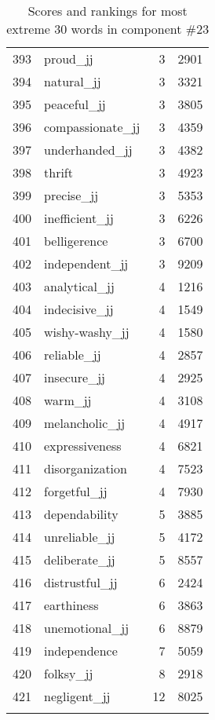 \begin{longtable}[!htbp]{| rlr@{.}l |}
    393 & proud\_jj & 3 & 2901 \\
    394 & natural\_jj & 3 & 3321 \\
    395 & peaceful\_jj & 3 & 3805 \\
    396 & compassionate\_jj & 3 & 4359 \\
    397 & underhanded\_jj & 3 & 4382 \\
    398 & thrift & 3 & 4923 \\
    399 & precise\_jj & 3 & 5353 \\
    400 & inefficient\_jj & 3 & 6226 \\
    401 & belligerence & 3 & 6700 \\
    402 & independent\_jj & 3 & 9209 \\
    403 & analytical\_jj & 4 & 1216 \\
    404 & indecisive\_jj & 4 & 1549 \\
    405 & wishy-washy\_jj & 4 & 1580 \\
    406 & reliable\_jj & 4 & 2857 \\
    407 & insecure\_jj & 4 & 2925 \\
    408 & warm\_jj & 4 & 3108 \\
    409 & melancholic\_jj & 4 & 4917 \\
    410 & expressiveness & 4 & 6821 \\
    411 & disorganization & 4 & 7523 \\
    412 & forgetful\_jj & 4 & 7930 \\
    413 & dependability & 5 & 3885 \\
    414 & unreliable\_jj & 5 & 4172 \\
    415 & deliberate\_jj & 5 & 8557 \\
    416 & distrustful\_jj & 6 & 2424 \\
    417 & earthiness & 6 & 3863 \\
    418 & unemotional\_jj & 6 & 8879 \\
    419 & independence & 7 & 5059 \\
    420 & folksy\_jj & 8 & 2918 \\
    421 & negligent\_jj & 12 & 8025 \\
    \hline
    \caption{Scores and rankings for most extreme 30 words in component \#23} \\
\end{longtable}
